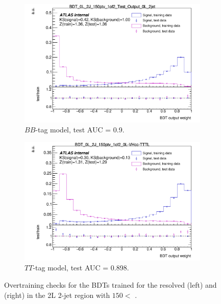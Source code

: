 

\begin{figure}[h!]
    \hspace{-0.3cm}
    \begin{subfigure}[b]{0.49\textwidth}
        \centering
      \includegraphics[width=\textwidth]{Images/VH/Discriminants/OvertrainCheck_BDT_0L_2J_150ptv_1of2_Test_Output_0L_2jet.pdf}
    \caption{\vhb $BB$-tag model, test AUC = 0.9.} 
    \end{subfigure}
    \begin{subfigure}[b]{0.49\textwidth}
        \centering
      \includegraphics[width=\textwidth]{Images/VH/Discriminants/OvertrainCheck_BDT_0L_2J_150ptv_1of2_0L-VHcc-TTTL.pdf}
      \caption{\vhc $TT$-tag model, test AUC = 0.898.}
    \end{subfigure}
    \caption{Overtraining checks for the BDTs trained for the resolved \vhb (left) and \vhc (right) in the 2L 2-jet region with $150 <$ \ptv.}
    \label{fig:overtrainingCheck}
\end{figure} 


